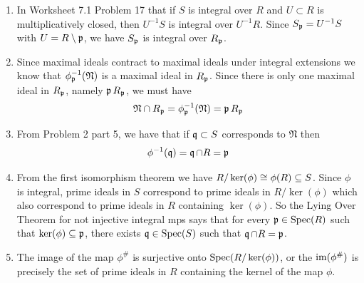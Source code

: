 \documentclass[Notebook.tex]{subfiles}
\begin{document}
\begin{solution}
    \bbni
    \begin{enumerate}
        \item In Worksheet 7.1 Problem 17 that if $S$ is integral over $R$ and $U\subset R$ is multiplicatively closed, then $U^{-1}S$ is integral over $U^{-1}R$. Since $S_{\operatorname{\mathfrak{p}}} = U^{-1}S$ with $U = R \setminus \operatorname{\mathfrak{p}}$, we have $S_{\operatorname{\mathfrak{p}}}$ is integral over $R_{\operatorname{\mathfrak{p}}}$. 
        \item Since maximal ideals contract to maximal ideals under integral extensions we know that $\phi_{\operatorname{\mathfrak{p}}}^{-1}(\mathfrak{N})$ is a maximal ideal in $R_{\operatorname{\mathfrak{p}}}$. Since there is only one maximal ideal in $R_{\operatorname{\mathfrak{p}}}$, namely $\operatorname{\mathfrak{p}} R_{\operatorname{\mathfrak{p}}}$, we must have 
        \[\mathfrak{N} \cap R_{\operatorname{\mathfrak{p}}} = \phi_{\operatorname{\mathfrak{p}}}^{-1}(\mathfrak{N}) = \operatorname{\mathfrak{p}} R_{\operatorname{\mathfrak{p}}} \]

        \item From Problem 2 part 5, we have that if $\operatorname{\mathfrak{q}} \subset S$ corresponds to $\mathfrak{N}$ then 
        \[\phi^{-1}(\operatorname{\mathfrak{q}}) = \operatorname{\mathfrak{q}} \cap R = \operatorname{\mathfrak{p}}\]

        \item From the first isomorphism theorem we have $R/\ker(\phi) \cong \phi(R) \subseteq S$. Since $\phi$ is integral, prime ideals in $S$ correspond to prime ideals in $R/\ker(\phi)$ which also correspond to prime ideals in $R$ containing $\ker(\phi)$. So the Lying Over Theorem  for not injective integral mps says that for every $\operatorname{\mathfrak{p}}\in\operatorname{Spec}(R)$ such that $\ker(\phi) \subseteq \operatorname{\mathfrak{p}}$, there exists $\operatorname{\mathfrak{q}}\in\operatorname{Spec}(S)$ such that $\operatorname{\mathfrak{q}}\cap R=\operatorname{\mathfrak{p}}$.
        
        \item The image of the map $\phi^{\#}$ is surjective onto $\operatorname{Spec}(R/\ker(\phi))$, or the $\operatorname{im}(\phi^{\#})$ is precisely the set of prime ideals in $R$ containing the kernel of the map $\phi$. 
    \end{enumerate}
\end{solution}

\newpage 
\end{document}
